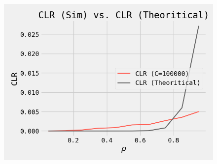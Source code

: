 \begin{figure}[ht!]
\begin{minipage}[]{0.33\linewidth}
  \includegraphics[width=\linewidth]{Figures/task3_2.png}
  \label{fig2}
 \end{minipage}
\end{figure}

